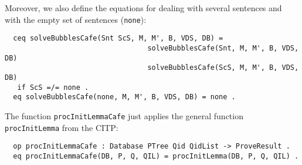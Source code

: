 Moreover, we also define the equations for dealing with several sentences and with the
empty set of sentences (\verb"none"):

{\codesize
\begin{verbatim}
  ceq solveBubblesCafe(Snt ScS, M, M', B, VDS, DB) =
                                  solveBubblesCafe(Snt, M, M', B, VDS, DB)
                                  solveBubblesCafe(ScS, M, M', B, VDS, DB)
   if ScS =/= none .
  eq solveBubblesCafe(none, M, M', B, VDS, DB) = none .
\end{verbatim}
}

{\codesize
\begin{comment}
  op labels2metadataAtS : AttrSet -> AttrSet .
  eq labels2metadataAtS(label(Q) AtS) = label(Q) metadata("#label-" + string(Q)) AtS .
  eq labels2metadataAtS(AtS) = AtS [owise] .
\end{comment}
}


The function \verb"procInitLemmaCafe" just applies the general
function \verb"procInitLemma" from the CITP:

{\codesize
\begin{verbatim}
  op procInitLemmaCafe : Database PTree Qid QidList -> ProveResult .
  eq procInitLemmaCafe(DB, P, Q, QIL) = procInitLemma(DB, P, Q, QIL) .
\end{verbatim}
}

